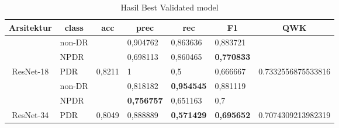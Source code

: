 \begin{table}[hbtp]
	\begin{center}
		\caption{Hasil Best Validated model}
		\label{tb:HasilValDefault}
		\begin{tabular}{|c|l|c|l|l|l|c|}
			\hline
			\rowcolor[HTML]{C0C0C0} 
			Arsitektur & \multicolumn{1}{c|}{\cellcolor[HTML]{C0C0C0}class} & acc                      & \multicolumn{1}{c|}{\cellcolor[HTML]{C0C0C0}prec} & \multicolumn{1}{c|}{\cellcolor[HTML]{C0C0C0}rec} & \multicolumn{1}{c|}{\cellcolor[HTML]{C0C0C0}F1} & QWK                                  \\ \hline
			& non-DR                                             &                          & 0,904762                                          & 0,863636                                         & 0,883721                                        &                                      \\ \cline{2-2} \cline{4-6}
			& NPDR                                               &                          & 0,698113                                          & 0,860465                                         & \textbf{0,770833}                               &                                      \\ \cline{2-2} \cline{4-6}
			\multirow{-3}{*}{ResNet-18}  & PDR                                                & \multirow{-3}{*}{0,8211} & 1                                                 & 0,5                                              & 0,666667                                        & \multirow{-3}{*}{0.7332556875533816} \\ \hline
			& non-DR                                             &                          & 0,818182                                          & \textbf{0,954545}                                & 0,881119                                        &                                      \\ \cline{2-2} \cline{4-6}
			& NPDR                                               &                          & \textbf{0,756757}                                 & 0,651163                                         & 0,7                                             &                                      \\ \cline{2-2} \cline{4-6}
			\multirow{-3}{*}{ResNet-34}  & PDR                                                & \multirow{-3}{*}{0,8049} & 0,888889                                          & \textbf{0,571429}                                & \textbf{0,695652}                                        & \multirow{-3}{*}{0.7074309213982319} \\ \hline

\end{tabular}
\end{center}
\end{table}
